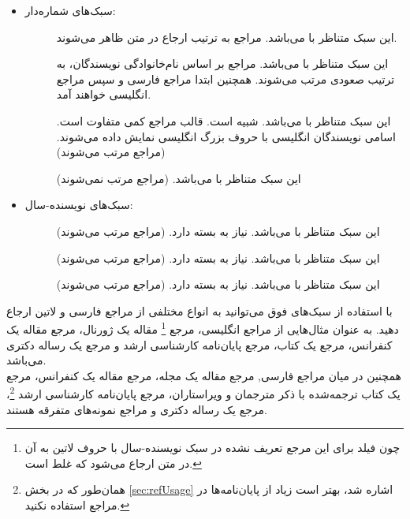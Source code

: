 \singlespacing
\begin{itemize}
\item سبک‌های شماره‌دار:
	\begin{description}
	\item [] این سبک متناظر با  می‌باشد. مراجع به ترتیب ارجاع در متن ظاهر می‌شوند.
	\item [] این سبک متناظر با  می‌باشد. مراجع بر اساس نام‌خانوادگی نویسندگان، به ترتیب صعودی مرتب می‌شوند.
	 همچنین ابتدا مراجع فارسی و سپس مراجع انگلیسی خواهند آمد.
	\item [] این سبک متناظر با  می‌باشد. شبیه  است. قالب مراجع کمی متفاوت است. اسامی نویسندگان انگلیسی با حروف بزرگ انگلیسی نمایش داده می‌شوند. (مراجع مرتب می‌شوند)
	\item [] این سبک متناظر با  می‌باشد. (مراجع مرتب نمی‌شوند)
	\end{description}

\item سبک‌های نویسنده-سال:
	\begin{description}
	\item [] این سبک متناظر با  می‌باشد. نیاز به بسته  دارد. (مراجع مرتب می‌شوند)
	\item [] این سبک متناظر با  می‌باشد. نیاز به بسته  دارد. (مراجع مرتب می‌شوند)
	\item [] این سبک متناظر با  می‌باشد. نیاز به بسته  دارد. (مراجع مرتب می‌شوند)
	\end{description}
\end{itemize}
\doublespacing

با استفاده از سبک‌های فوق می‌توانید به انواع مختلفی از مراجع فارسی و لاتین ارجاع دهید.
به عنوان مثال‌هایی از
مراجع انگلیسی،
مرجع
\cite{Baker02limits}\footnote{چون فیلد  برای این مرجع تعریف نشده در سبک نویسنده-سال با حروف لاتین به آن در متن ارجاع می‌شود که غلط است.}
مقاله یک ژورنال، مرجع
\cite{Amintoosi09video}
مقاله یک کنفرانس، مرجع
یک کتاب، مرجع
\cite{Khalighi07MscThesis}
پایان‌نامه کارشناسی ارشد و مرجع
یک رساله دکتری می‌باشد.\\
همچنین در میان
مراجع فارسی,
مرجع
\cite{Vahedi87}
مقاله یک مجله، مرجع
\cite{Amintoosi87afzayesh}
مقاله یک کنفرانس، مرجع
\cite{Pedram80osool}
یک کتاب ترجمه‌شده با ذکر مترجمان و ویراستاران، مرجع
\cite{Pourmousa88mscThesis}
پایان‌نامه کارشناسی ارشد%
\footnote{همان‌طور که در بخش
\ref{sec:refUsage}
اشاره شد، بهتر است زیاد از پایان‌نامه‌ها در مراجع استفاده نکنید.}،
مرجع
\cite{Omidali82phdThesis}
یک رساله دکتری و مراجع
\cite{persianbib87userguide, Khalighi87xepersian}
نمونه‌های متفرقه هستند.

